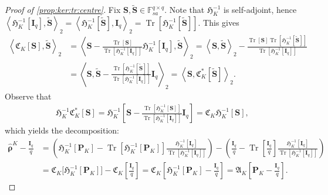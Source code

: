 \documentclass[noinfoline]{imsart}\setcounter{tocdepth}{2}
\renewcommand{\b}[1]{\mathbb{#1}} %
\newcommand{\m}[1]{\mathbf{#1}} %
\newcommand{\f}[1]{\mathfrak{#1}} %
\newcommand{\mb}[1]{\boldsymbol{#1}} %
\newcommand{\tr}[1]{\operatorname{Tr}\left[#1\right]}
\newcommand{\innpr}[2]{{\left\langle {#1},{#2}\right\rangle}} %
\theoremstyle{plain}
\begin{document}
\begin{appendix}
\begin{proof}[Proof of \cref{prop:ker:tr:centre}]
Fix $\m{S}, \tilde{\m{S}} \in \b{F}_{sa}^{q \times q}$. Note that $\f{H}_K^{-1}$ is self-adjoint, hence $\innpr{\f{H}_K^{-1}[\m{I}_{q}]}{\tilde{\m{S}}}_{2} = \innpr{\f{H}_K^{-1}[\tilde{\m{S}}]}{\m{I}_{q}}_{2} = \tr{\f{H}_K^{-1}[\tilde{\m{S}}]}$.
This gives
\begin{align*}
    \innpr{\f{C}_{K}[\m{S}]}{\tilde{\m{S}}}_{2} &= \innpr{\m{S} - \frac{ \tr{\m{S}}}{\tr{\f{H}_K^{-1}[\m{I}_{q}]}} \f{H}_K^{-1}[\m{I}_{q}]}{\tilde{\m{S}}}_{2} = \innpr{\m{S}}{\tilde{\m{S}}}_{2} - \frac{ \tr{\m{S}} \tr{\f{H}_K^{-1}[\tilde{\m{S}}]}}{\tr{\f{H}_K^{-1}[\m{I}_{q}]}} \\
    &= \innpr{\m{S}}{\tilde{\m{S}} - \frac{ \tr{\f{H}_K^{-1}[\tilde{\m{S}}]}}{\tr{\f{H}_K^{-1}[\m{I}_{q}]}} \m{I}_{q}}_{2} = \innpr{\m{S}}{\f{C}_{K}^{*}[\tilde{\m{S}}]}_{2}.
\end{align*}
Observe that
\begin{align*}
    \f{H}_{K}^{-1} \f{C}_{K}^{*} [\m{S}] = \f{H}_{K}^{-1} \left[ \m{S} - \frac{ \tr{\f{H}_K^{-1}[\m{S}]}}{\tr{\f{H}_K^{-1}[\m{I}_{q}]}} \m{I}_{q} \right] 
    = \f{C}_{K} \f{H}_{K}^{-1} [\m{S}], 
\end{align*}
which yields the decomposition:
\begin{align*}
    \hat{\mb{\rho}}^{K} - \frac{\m{I}_{q}}{q} &= \left( \f{H}_K^{-1}[\m{P}_K] - \tr{\f{H}_K^{-1}[\m{P}_K]} \frac{\f{H}_K^{-1}[\m{I}_{q}]}{\tr{\f{H}_K^{-1}[\m{I}_{q}]}} \right) - \left( \frac{\m{I}_{q}}{q} - \tr{\frac{\m{I}_{q}}{q}} \frac{\f{H}_K^{-1}[\m{I}_{q}]}{\tr{\f{H}_K^{-1}[\m{I}_{q}]}} \right) \\
    &= \f{C}_{K} \big[ \f{H}_K^{-1}[\m{P}_K] \big] - \f{C}_{K} \left[ \frac{\m{I}_{q}}{q} \right] = \f{C}_{K} \left[ \f{H}_K^{-1}[\m{P}_K] - \frac{\m{I}_{q}}{q} \right] = \f{A}_{K} \left[\m{P}_K - \frac{\m{I}_{q}}{q} \right].
\end{align*}
\end{proof}



\end{appendix}
\end{document}
